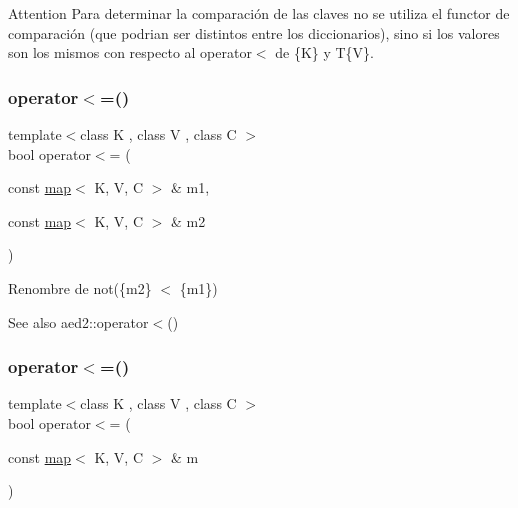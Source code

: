 \begin{DoxyAttention}{Attention}
Para determinar la comparación de las claves no se utiliza el functor de comparación (que podrian ser distintos entre los diccionarios), sino si los valores son los mismos con respecto al operator$<$ de \{K\} y T\{V\}. 
\end{DoxyAttention}
\mbox{\label{classaed2_1_1map_afe374b37f17263d0cad3ee19a590d208}} 
\subsubsection{\texorpdfstring{operator$<$=()}{operator<=()}\hspace{0.1cm}{\footnotesize\ttfamily [1/2]}}
{\footnotesize\ttfamily template$<$class K , class V , class C $>$ \\
bool operator$<$= (\begin{DoxyParamCaption}\item[{const \hyperlink{classaed2_1_1map}{map}$<$ K, V, C $>$ \&}]{m1,  }\item[{const \hyperlink{classaed2_1_1map}{map}$<$ K, V, C $>$ \&}]{m2 }\end{DoxyParamCaption})\hspace{0.3cm}{\ttfamily [related]}}



Renombre de not(\{m2\} $<$ \{m1\}) 

\begin{DoxySeeAlso}{See also}
aed2\+::operator$<$() 
\end{DoxySeeAlso}
\mbox{\label{classaed2_1_1map_a42f66578aa7e80b91eded54ac6b745cf}} 
\subsubsection{\texorpdfstring{operator$<$=()}{operator<=()}\hspace{0.1cm}{\footnotesize\ttfamily [2/2]}}
{\footnotesize\ttfamily template$<$class K , class V , class C $>$ \\
bool operator$<$= (\begin{DoxyParamCaption}\item[{const \hyperlink{classaed2_1_1map}{map}$<$ K, V, C $>$ \&}]{m }\end{DoxyParamCaption})\hspace{0.3cm}{\ttfamily [related]}}



